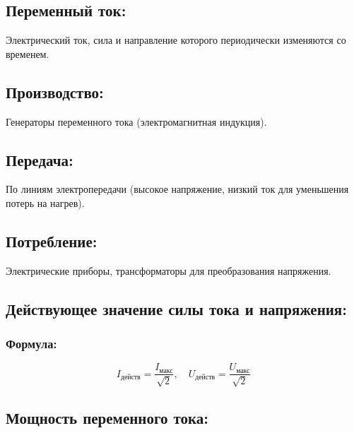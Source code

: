 \documentclass[a4paper,12pt]{article}
\begin{document}
\subsection*{Переменный ток:}
\vspace{-3pt}
Электрический ток, сила и направление которого периодически изменяются со временем.

\vspace{-9pt}
\subsection*{Производство:}
\vspace{-3pt}
Генераторы переменного тока (электромагнитная индукция).

\vspace{-9pt}
\subsection*{Передача:}
\vspace{-3pt}
По линиям электропередачи (высокое напряжение, низкий ток для уменьшения потерь на нагрев).

\vspace{-9pt}
\subsection*{Потребление:}
\vspace{-3pt}
Электрические приборы, трансформаторы для преобразования напряжения.

\vspace{-9pt}
\subsection*{Действующее значение силы тока и напряжения:}
\vspace{-3pt}
\subsubsection*{Формула:}
\vspace{-0.05em}
$$ I_{\text{действ}} = \frac{I_{\text{макс}}}{\sqrt{2}}, \quad U_{\text{действ}} = \frac{U_{\text{макс}}}{\sqrt{2}} $$

\vspace{-9pt}
\subsection*{Мощность переменного тока:}
\vspace{-3pt}
\end{document}
